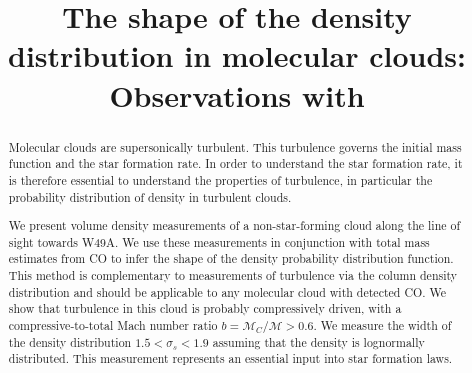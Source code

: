 \title{The shape of the density distribution in molecular clouds: Observations with
\formaldehyde}
\begin{abstract}
    Molecular clouds are supersonically turbulent.  This turbulence governs
    the initial mass function and the star formation rate.  In order to
    understand the star formation rate, it is therefore essential to understand
    the properties of turbulence, in particular the probability distribution of
    density in turbulent clouds.

    We present \formaldehyde volume density measurements of a non-star-forming
    cloud along the line of sight towards W49A. We use these measurements in
    conjunction with total mass estimates from CO to infer the shape of the
    density probability distribution function.  This method is complementary to
    measurements of turbulence via the column density distribution and should
    be applicable to any molecular cloud with detected CO.  We show that
    turbulence in this cloud is probably compressively driven, with a
    compressive-to-total Mach number ratio $b = \mathcal{M}_C/\mathcal{M}>0.6$.  
    We measure the width of the density distribution $1.5 < \sigma_s < 1.9$
    assuming that the density is lognormally distributed.  This measurement
    represents an essential input into star formation laws.



\end{abstract}
